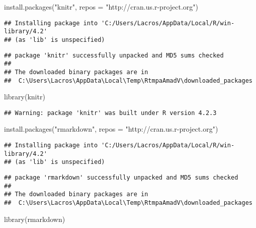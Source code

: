 \documentclass[
]{article}
\newenvironment{Shaded}{\begin{snugshade}}{\end{snugshade}}
\newcommand{\AttributeTok}[1]{\textcolor[rgb]{0.77,0.63,0.00}{#1}}
\newcommand{\FunctionTok}[1]{\textcolor[rgb]{0.00,0.00,0.00}{#1}}
\newcommand{\NormalTok}[1]{#1}
\newcommand{\StringTok}[1]{\textcolor[rgb]{0.31,0.60,0.02}{#1}}
\begin{document}
\begin{Shaded}
\begin{Highlighting}[]
\FunctionTok{install.packages}\NormalTok{(}\StringTok{"knitr"}\NormalTok{, }\AttributeTok{repos =} \StringTok{"http://cran.us.r{-}project.org"}\NormalTok{)}
\end{Highlighting}
\end{Shaded}

\begin{verbatim}
## Installing package into 'C:/Users/Lacros/AppData/Local/R/win-library/4.2'
## (as 'lib' is unspecified)
\end{verbatim}

\begin{verbatim}
## package 'knitr' successfully unpacked and MD5 sums checked
## 
## The downloaded binary packages are in
##  C:\Users\Lacros\AppData\Local\Temp\RtmpaAmadV\downloaded_packages
\end{verbatim}

\begin{Shaded}
\begin{Highlighting}[]
\FunctionTok{library}\NormalTok{(knitr)}
\end{Highlighting}
\end{Shaded}

\begin{verbatim}
## Warning: package 'knitr' was built under R version 4.2.3
\end{verbatim}

\begin{Shaded}
\begin{Highlighting}[]
\FunctionTok{install.packages}\NormalTok{(}\StringTok{"rmarkdown"}\NormalTok{, }\AttributeTok{repos =} \StringTok{"http://cran.us.r{-}project.org"}\NormalTok{)}
\end{Highlighting}
\end{Shaded}

\begin{verbatim}
## Installing package into 'C:/Users/Lacros/AppData/Local/R/win-library/4.2'
## (as 'lib' is unspecified)
\end{verbatim}

\begin{verbatim}
## package 'rmarkdown' successfully unpacked and MD5 sums checked
## 
## The downloaded binary packages are in
##  C:\Users\Lacros\AppData\Local\Temp\RtmpaAmadV\downloaded_packages
\end{verbatim}

\begin{Shaded}
\begin{Highlighting}[]
\FunctionTok{library}\NormalTok{(rmarkdown)}
\end{Highlighting}
\end{Shaded}
\end{document}
